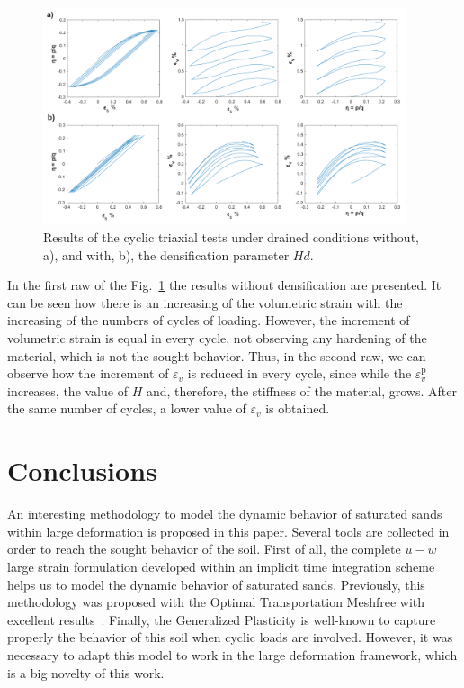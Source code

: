 \documentclass[preprint,12pt,a4paper]{elsarticle}
\begin{document}
\begin{figure}
\centering
\includegraphics[width=0.95\textwidth]{Figs/ciclo_drained.pdf}
\caption{Results of the cyclic triaxial tests under drained conditions without, a), and with, b), the densification parameter $Hd$.}
\label{fig_c_drained}
\end{figure}

In the first raw of the Fig.~\ref{fig_c_drained} the results without densification are presented. It can be seen how there is an increasing of the volumetric strain with the increasing of the numbers of cycles of loading. However, the increment of volumetric strain is equal in every cycle, not observing any hardening of the material, which is not the sought behavior. Thus, in the second raw, we can observe how the increment of $\varepsilon_{v}$ is reduced in every cycle, since while the $\varepsilon_{v}^{\mathrm{p}}$ increases, the value of $H$ and, therefore, the stiffness of the material, grows. After the same number of cycles, a lower value of $\varepsilon_{v}$ is obtained.


\section{Conclusions}
\label{sec:6}

An interesting methodology to model the dynamic behavior of saturated sands within large deformation is proposed in this paper. Several tools are collected in order to reach the sought behavior of the soil. First of all, the complete $u-w$ large strain formulation developed within an implicit time integration scheme helps us to model the dynamic behavior of saturated sands. Previously, this methodology was proposed with the Optimal Transportation Meshfree with excellent results~\cite{Navas:17c}. Finally, the Generalized Plasticity is well-known to capture properly the behavior of this soil when cyclic loads are involved. However, it was necessary to adapt this model to work in the large deformation framework, which is a big novelty of this work.
\end{document}
